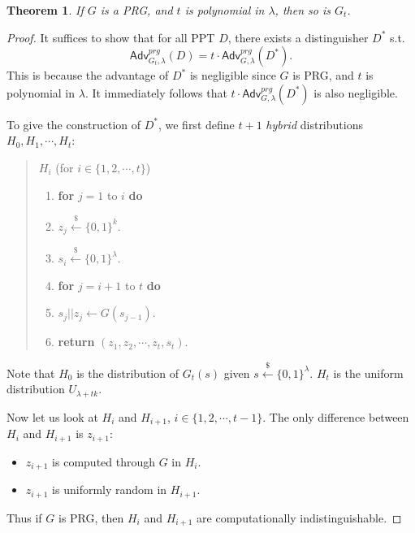 \documentclass[12pt]{article}
\newcommand{\bits}{\{0,1\}}
\newcommand{\getsr}{\stackrel{\$}{\gets}}
\newcommand{\Adv}{\mathsf{Adv}}
\newcommand{\tab}{\hspace{0.3in}}
\newtheorem{theorem}{Theorem}[section]
\theoremstyle{definition}
\begin{document}
\begin{theorem}
If $G$ is a PRG, and $t$ is polynomial in $\lambda$, then so is $G_t$.
\end{theorem}
\begin{proof}
It suffices to show that for all PPT $D$, there exists a distinguisher $D^*$ s.t.
$$\Adv_{G_t,\lambda}^{prg}(D) = t\cdot \Adv_{G,\lambda}^{prg}(D^*).$$
This is because the advantage of $D^*$ is negligible since $G$ is PRG, and $t$ is polynomial in $\lambda$. It immediately follows that $t\cdot \Adv_{G,\lambda}^{prg}(D^*)$ is also negligible.

To give the construction of $D^*$, we first define $t+1$ \emph{hybrid} distributions $H_0, H_1, \cdots, H_t$:
\begin{quote}
$H_i$ (for $i \in \{1, 2, \cdots, t\}$)
\begin{enumerate}
\item {\bf for} $j=1$ to $i$ {\bf do}
\item \tab $z_j \getsr \bits^k$.
\item $s_i \getsr \bits^\lambda$.
\item {\bf for} $j=i+1$ to $t$ {\bf do}
\item \tab $s_j||z_j \gets G(s_{j-1})$.
\item {\bf return} $(z_1, z_2, \cdots, z_t, s_t)$.
\end{enumerate}
\end{quote}
Note that $H_0$ is the distribution of $G_t(s)$ given $s \getsr \bits^\lambda$. $H_t$ is the uniform distribution $U_{\lambda+tk}$.

Now let us look at $H_i$ and $H_{i+1}$, $i \in \{1, 2, \cdots, t-1\}$. The only difference between $H_i$ and $H_{i+1}$ is $z_{i+1}$:
\begin{itemize}
\item $z_{i+1}$ is computed through $G$ in $H_i$.
\item $z_{i+1}$ is uniformly random in $H_{i+1}$.
\end{itemize}
Thus if $G$ is PRG, then $H_i$ and $H_{i+1}$ are computationally indistinguishable.


\end{proof}
\end{document}
